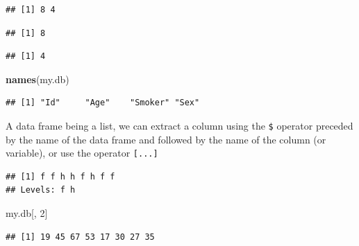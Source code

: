 \documentclass[]{book}
\newenvironment{Shaded}{\begin{snugshade}}{\end{snugshade}}
\newcommand{\CommentTok}[1]{\textcolor[rgb]{0.56,0.35,0.01}{\textit{#1}}}
\newcommand{\DecValTok}[1]{\textcolor[rgb]{0.00,0.00,0.81}{#1}}
\newcommand{\KeywordTok}[1]{\textcolor[rgb]{0.13,0.29,0.53}{\textbf{#1}}}
\newcommand{\NormalTok}[1]{#1}
\newcommand{\OperatorTok}[1]{\textcolor[rgb]{0.81,0.36,0.00}{\textbf{#1}}}
\newcommand{\OtherTok}[1]{\textcolor[rgb]{0.56,0.35,0.01}{#1}}
\newcommand{\StringTok}[1]{\textcolor[rgb]{0.31,0.60,0.02}{#1}}
\begin{document}
\begin{verbatim}
## [1] 8 4
\end{verbatim}

\begin{verbatim}
## [1] 8
\end{verbatim}

\begin{verbatim}
## [1] 4
\end{verbatim}

\begin{Shaded}
\begin{Highlighting}[]
\KeywordTok{names}\NormalTok{(my.db)}
\end{Highlighting}
\end{Shaded}

\begin{verbatim}
## [1] "Id"     "Age"    "Smoker" "Sex"
\end{verbatim}

A data frame being a list, we can extract a column using the \texttt{\$} operator preceded by the name of the data frame and followed by the name of the column (or variable), or use the operator \texttt{{[}...{]}}

\begin{Shaded}
\end{Shaded}

\begin{verbatim}
## [1] f f h h f h f f
## Levels: f h
\end{verbatim}

\begin{Shaded}
\begin{Highlighting}[]
\NormalTok{my.db[, }\DecValTok{2}\NormalTok{]}
\end{Highlighting}
\end{Shaded}

\begin{verbatim}
## [1] 19 45 67 53 17 30 27 35
\end{verbatim}

\begin{Shaded}
\end{Shaded}
\end{document}
